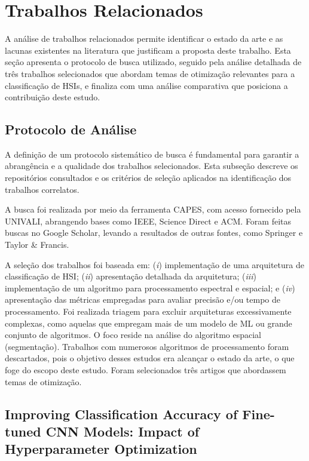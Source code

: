 \section{Trabalhos Relacionados}
\label{sec:trabRel}

A análise de trabalhos relacionados permite identificar o estado da arte e as lacunas existentes na literatura que justificam a proposta deste trabalho. Esta seção apresenta o protocolo de busca utilizado, seguido pela análise detalhada de três trabalhos selecionados que abordam temas de otimização relevantes para a classificação de HSIs, e finaliza com uma análise comparativa que posiciona a contribuição deste estudo.

\subsection{Protocolo de Análise}

A definição de um protocolo sistemático de busca é fundamental para garantir a abrangência e a qualidade dos trabalhos selecionados. Esta subseção descreve os repositórios consultados e os critérios de seleção aplicados na identificação dos trabalhos correlatos.

A busca foi realizada por meio da ferramenta CAPES, com acesso fornecido pela UNIVALI, abrangendo bases como IEEE, Science Direct e ACM. Foram feitas buscas no Google Scholar, levando a resultados de outras fontes, como Springer e Taylor \& Francis.

A seleção dos trabalhos foi baseada em:
(\textit{i}) implementação de uma arquitetura de classificação de HSI;
(\textit{ii}) apresentação detalhada da arquitetura;
(\textit{iii}) implementação de um algoritmo para processamento espectral e espacial; e
(\textit{iv}) apresentação das métricas empregadas para avaliar precisão e/ou tempo de processamento.
Foi realizada triagem para excluir arquiteturas excessivamente complexas, como aquelas que empregam mais de um modelo de ML ou grande conjunto de algoritmos. O foco reside na análise do algoritmo espacial (segmentação). Trabalhos com numerosos algoritmos de processamento foram descartados, pois o objetivo desses estudos era alcançar o estado da arte, o que foge do escopo deste estudo. Foram selecionados três artigos que abordassem temas de otimização.

\subsection{Improving Classification Accuracy of Fine-tuned CNN Models: Impact of Hyperparameter Optimization}


